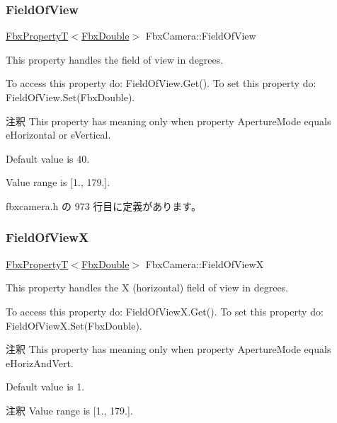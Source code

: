 \subsubsection{\texorpdfstring{Field\+Of\+View}{FieldOfView}}
{\footnotesize\ttfamily \hyperlink{class_fbx_property_t}{Fbx\+PropertyT}$<$\hyperlink{fbxtypes_8h_a171e72a1c46fc15c1a6c9c31948c1c5b}{Fbx\+Double}$>$ Fbx\+Camera\+::\+Field\+Of\+View}

This property handles the field of view in degrees.

To access this property do\+: Field\+Of\+View.\+Get(). To set this property do\+: Field\+Of\+View.\+Set(\+Fbx\+Double).

\begin{DoxyRemark}{注釈}
This property has meaning only when property Aperture\+Mode equals e\+Horizontal or e\+Vertical.

Default value is 40. 

Value range is \mbox{[}1., 179.\mbox{]}. 
\end{DoxyRemark}


 fbxcamera.\+h の 973 行目に定義があります。

\mbox{\label{class_fbx_camera_a2e0c65d8225c5f73c6cf9a927a0523fb}} 
\subsubsection{\texorpdfstring{Field\+Of\+ViewX}{FieldOfViewX}}
{\footnotesize\ttfamily \hyperlink{class_fbx_property_t}{Fbx\+PropertyT}$<$\hyperlink{fbxtypes_8h_a171e72a1c46fc15c1a6c9c31948c1c5b}{Fbx\+Double}$>$ Fbx\+Camera\+::\+Field\+Of\+ViewX}

This property handles the X (horizontal) field of view in degrees.

To access this property do\+: Field\+Of\+View\+X.\+Get(). To set this property do\+: Field\+Of\+View\+X.\+Set(\+Fbx\+Double).

\begin{DoxyRemark}{注釈}
This property has meaning only when property Aperture\+Mode equals e\+Horiz\+And\+Vert.
\end{DoxyRemark}
Default value is 1. \begin{DoxyRemark}{注釈}
Value range is \mbox{[}1., 179.\mbox{]}. 
\end{DoxyRemark}


